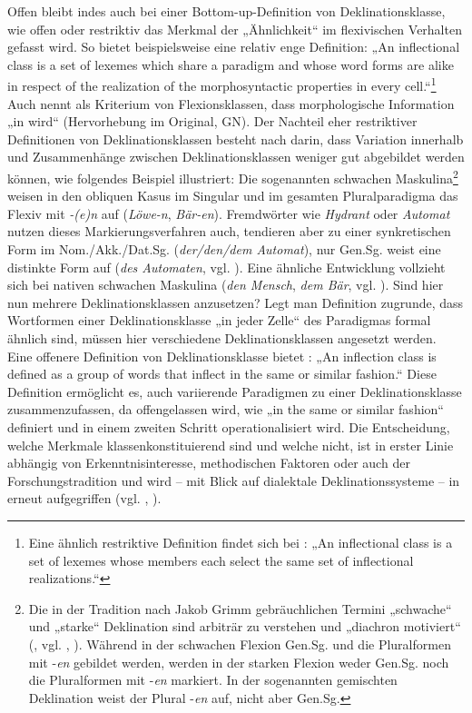 Offen bleibt indes auch bei einer Bottom-up-Definition von Deklinationsklasse, wie offen oder restriktiv das Merkmal der „Ähnlichkeit“ im flexivischen Verhalten gefasst wird. So bietet beispielsweise \citet[323]{Carstairs-McCarthy1998} eine relativ enge Definition: „An inflectional class is a set of lexemes which share a paradigm and whose word forms are alike in respect of the realization of the morphosyntactic properties in every cell.“\footnote{Eine ähnlich restriktive Definition findet sich bei \citet[23]{Aronoff1994}: „An inflectional class is a set of lexemes whose members each select the same set of inflectional realizations.“}  Auch \citet[66--67]{Wurzel1984} nennt als Kriterium von Flexionsklassen, dass morphologische Information „in  wird“ (Hervorhebung im Original, GN). Der Nachteil eher restriktiver Definitionen von Deklinationsklassen besteht nach \citet[22]{Kürschner2008a} darin, dass Variation innerhalb und Zusammenhänge zwischen Deklinationsklassen weniger gut abgebildet werden können, wie folgendes Beispiel illustriert: Die sogenannten schwachen Maskulina\footnote{Die in der Tradition nach Jakob Grimm gebräuchlichen Termini „schwache“ und „starke“ Deklination sind arbiträr zu verstehen und „diachron motiviert“ (\citealt[1691]{Solms2004}, vgl. \citealt[283]{Nübling2008}, \citealt[79]{KleinEtAl2018}). Während in der schwachen Flexion Gen.Sg. und die Pluralformen mit -\textit{en} gebildet werden, werden in der starken Flexion weder Gen.Sg. noch die Pluralformen mit -\textit{en} markiert. In der sogenannten gemischten Deklination weist der Plural -\textit{en} auf, nicht aber Gen.Sg.} weisen in den obliquen Kasus im Singular und im gesamten Pluralparadigma das Flexiv mit \textit{{}-(e)n} auf (\textit{Löwe-n}, \textit{Bär-en}). Fremdwörter wie \textit{Hydrant} oder \textit{Automat} nutzen dieses Markierungsverfahren auch, tendieren aber zu einer synkretischen Form im Nom./Akk./Dat.Sg. (\textit{der/den/dem Automat}), nur Gen.Sg. weist eine distinkte Form auf (\textit{des Automaten}, vgl. \citealt{Thieroff2003}). Eine ähnliche Entwicklung vollzieht sich bei nativen schwachen Maskulina (\textit{den Mensch}, \textit{dem Bär}, vgl. \citealt[215]{DammelGillmann2014}). Sind hier nun mehrere Deklinationsklassen anzusetzen? Legt man  Definition zugrunde, dass Wortformen einer Deklinationsklasse „in jeder Zelle“ des Paradigmas formal ähnlich sind, müssen hier verschiedene Deklinationsklassen angesetzt werden.   Eine offenere Definition von Deklinationsklasse bietet \citet[140]{Enger1998}: „An inflection class is defined as a group of words that inflect in the same or similar fashion.“ Diese Definition ermöglicht es, auch variierende Paradigmen zu einer Deklinationsklasse zusammenzufassen, da offengelassen wird, wie „in the same or similar fashion“ definiert und in einem zweiten Schritt operationalisiert wird. Die Entscheidung, welche Merkmale klassenkonstituierend sind und welche nicht, ist in erster Linie abhängig von Erkenntnisinteresse, methodischen Faktoren oder auch der Forschungstradition und wird -- mit Blick auf dialektale Deklinationssysteme -- in  erneut aufgegriffen (vgl. \citealt[28]{Dammel2011}, \citealt[100]{Werner1969}).

